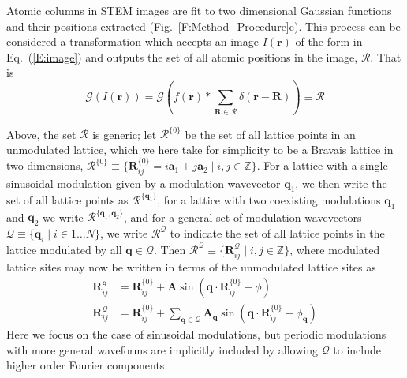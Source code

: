 \documentclass[12pt]{article}
\begin{document}
Atomic columns in STEM images are fit to two dimensional Gaussian functions and their positions extracted (Fig.~\ref{F:Method_Procedure}e).
This process can be considered a transformation which accepts an image $I(\mathbf{r})$ of the form in Eq.~(\ref{E:image}) and outputs the set of all atomic positions in the image, $\mathcal{R}$.
That is
\begin{equation*}
    \mathcal{G}\left(I(\mathbf{r})\right) = \mathcal{G}\left(f\left(\mathbf{r}\right) \ast \sum_{\mathbf{R}\in\mathcal{R}} \delta\left(\mathbf{r} - \mathbf{R}\right)\right) \equiv \mathcal{R}
\end{equation*}

Above, the set $\mathcal{R}$ is generic; let $\mathcal{R}^{\{0\}}$ be the set of all lattice points in an unmodulated lattice, which we here take for simplicity to be a Bravais lattice in two dimensions, $\mathcal{R}^{\{0\}}\equiv\{\mathbf{R}^{\{0\}}_{ij} = i\mathbf{a}_1 + j\mathbf{a}_2 \mid i,j \in \mathbb{Z}\}$.
For a lattice with a single sinusoidal modulation given by a modulation wavevector $\mathbf{q}_1$, we then write the set of all lattice points as $\mathcal{R}^{\{\mathbf{q}_1\}}$, for a lattice with two coexisting modulations $\mathbf{q}_1$ and $\mathbf{q}_2$ we write $\mathcal{R}^{\{\mathbf{q}_1, \mathbf{q}_2\}}$, and for a general set of modulation wavevectors $\mathcal{Q} \equiv \{\mathbf{q}_i \mid i \in 1 \ldots N\}$, we write $\mathcal{R}^{\mathcal{Q}}$ to indicate the set of all lattice points in the lattice modulated by all $\mathbf{q} \in \mathcal{Q}$.  Then $\mathcal{R}^{\mathcal{Q}} \equiv \{\mathbf{R}^\mathcal{Q}_{ij} \mid i,j \in \mathbb{Z}\}$, where modulated lattice sites may now be written in terms of the unmodulated lattice sites as
\begin{align}
    \mathbf{R}^{\mathbf{q}}_{ij} &= \mathbf{R}^{\{0\}}_{ij} + \mathbf{A}\sin\left(\mathbf{q}\cdot\mathbf{R}^{\{0\}}_{ij} + \phi\right)\nonumber\\
    \mathbf{R}^{\mathcal{Q}}_{ij} &= \mathbf{R}^{\{0\}}_{ij} + \sum_{\mathbf{q}\in\mathcal{Q}} \mathbf{A_{\mathbf{q}}}\sin\left(\mathbf{q}\cdot\mathbf{R}^{\{0\}}_{ij} + \phi_{\mathbf{q}}\right)\label{E:lattice_sites}
\end{align}
Here we focus on the case of sinusoidal modulations, but periodic modulations with more general waveforms are implicitly included by allowing $\mathcal{Q}$ to include higher order Fourier components.
\end{document}
